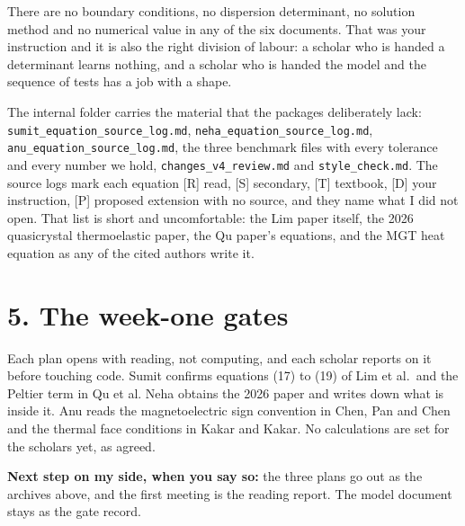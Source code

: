 \documentclass[11pt]{article}
\begin{document}
There are no boundary conditions, no dispersion determinant, no solution method and no numerical value in
any of the six documents. That was your instruction and it is also the right division of labour: a scholar
who is handed a determinant learns nothing, and a scholar who is handed the model and the sequence of tests
has a job with a shape.

The internal folder carries the material that the packages deliberately lack:
\texttt{sumit\_equation\_source\_log.md}, \texttt{neha\_equation\_source\_log.md},
\texttt{anu\_equation\_source\_log.md}, the three benchmark files with every tolerance and every number we
hold, \texttt{changes\_v4\_review.md} and \texttt{style\_check.md}. The source logs mark each equation [R]
read, [S] secondary, [T] textbook, [D] your instruction, [P] proposed extension with no source, and they
name what I did not open. That list is short and uncomfortable: the Lim paper itself, the 2026 quasicrystal
thermoelastic paper, the Qu paper's equations, and the MGT heat equation as any of the cited authors write
it.

\section*{5. The week-one gates}

Each plan opens with reading, not computing, and each scholar reports on it before touching code. Sumit
confirms equations (17) to (19) of Lim et al.\ and the Peltier term in Qu et al. Neha obtains the 2026 paper
and writes down what is inside it. Anu reads the magnetoelectric sign convention in Chen, Pan and Chen and
the thermal face conditions in Kakar and Kakar. No calculations are set for the scholars yet, as agreed.

\noindent\textbf{Next step on my side, when you say so:} the three plans go out as the archives above, and
the first meeting is the reading report. The model document stays as the gate record.
\end{document}
